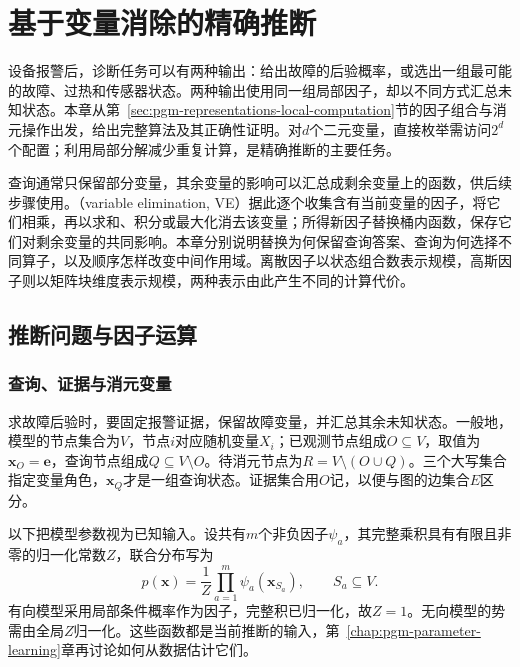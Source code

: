 \chapter{基于变量消除的精确推断}
\label{chap:pgm-elimination}

设备报警后，诊断任务可以有两种输出：给出故障的后验概率，或选出一组最可能的故障、过热和传感器状态。两种输出使用同一组局部因子，却以不同方式汇总未知状态。本章从第~\ref{sec:pgm-representations-local-computation}节的因子组合与消元操作出发，给出完整算法及其正确性证明。对$d$个二元变量，直接枚举需访问$2^d$个配置；利用局部分解减少重复计算，是精确推断的主要任务。

查询通常只保留部分变量，其余变量的影响可以汇总成剩余变量上的函数，供后续步骤使用。（variable elimination, VE）据此逐个收集含有当前变量的因子，将它们相乘，再以求和、积分或最大化消去该变量；所得新因子替换桶内函数，保存它们对剩余变量的共同影响。本章分别说明替换为何保留查询答案、查询为何选择不同算子，以及顺序怎样改变中间作用域。离散因子以状态组合数表示规模，高斯因子则以矩阵块维度表示规模，两种表示由此产生不同的计算代价。

\section{推断问题与因子运算}
\label{sec:pgm-elimination-factor-operations}

\subsection{查询、证据与消元变量}
\label{sec:pgm-elimination-query-evidence}

求故障后验时，要固定报警证据，保留故障变量，并汇总其余未知状态。一般地，模型的节点集合为$V$，节点$i$对应随机变量$X_i$；已观测节点组成$O\subseteq V$，取值为$\bm{x}_O=\bm{e}$，查询节点组成$Q\subseteq V\setminus O$。待消元节点为$R=V\setminus(O\cup Q)$。三个大写集合指定变量角色，$\bm{x}_Q$才是一组查询状态。证据集合用$O$记，以便与图的边集合$E$区分。

以下把模型参数视为已知输入。设共有$m$个非负因子$\psi_a$，其完整乘积具有有限且非零的归一化常数$Z$，联合分布写为
\begin{equation}
  p(\bm{x})=\frac{1}{Z}\prod_{a=1}^{m}\psi_a(\bm{x}_{S_a}),
  \qquad S_a\subseteq V.
  \label{eq:pgm-elimination-factorization}
\end{equation}
有向模型采用局部条件概率作为因子，完整积已归一化，故$Z=1$。无向模型的势需由全局$Z$归一化。这些函数都是当前推断的输入，第~\ref{chap:pgm-parameter-learning}章再讨论如何从数据估计它们。

